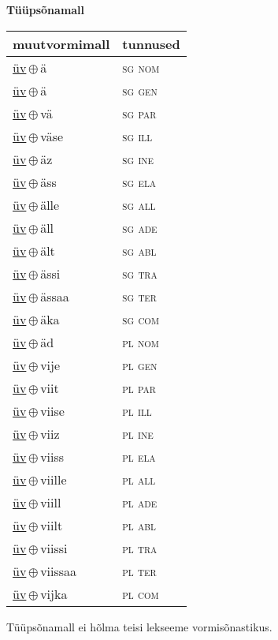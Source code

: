 

\vspace{3.5em}
\noindent \begin{minipage}{\textwidth}
\noindent \textbf{Tüüpsõnamall \,}\\

\begin{sideways}
\begin{tabular}{l l}
muutvormimall & tunnused \\
\hline
\underline{üv}\,$\oplus$\,ä & \textsc{ sg nom } \\
\underline{üv}\,$\oplus$\,ä & \textsc{ sg gen } \\
\underline{üv}\,$\oplus$\,vä & \textsc{ sg par } \\
\underline{üv}\,$\oplus$\,väse & \textsc{ sg ill } \\
\underline{üv}\,$\oplus$\,äz & \textsc{ sg ine } \\
\underline{üv}\,$\oplus$\,äss & \textsc{ sg ela } \\
\underline{üv}\,$\oplus$\,älle & \textsc{ sg all } \\
\underline{üv}\,$\oplus$\,äll & \textsc{ sg ade } \\
\underline{üv}\,$\oplus$\,ält & \textsc{ sg abl } \\
\underline{üv}\,$\oplus$\,ässi & \textsc{ sg tra } \\
\underline{üv}\,$\oplus$\,ässaa & \textsc{ sg ter } \\
\underline{üv}\,$\oplus$\,äka & \textsc{ sg com } \\
\underline{üv}\,$\oplus$\,äd & \textsc{ pl nom } \\
\underline{üv}\,$\oplus$\,vije & \textsc{ pl gen } \\
\underline{üv}\,$\oplus$\,viit & \textsc{ pl par } \\
\underline{üv}\,$\oplus$\,viise & \textsc{ pl ill } \\
\underline{üv}\,$\oplus$\,viiz & \textsc{ pl ine } \\
\underline{üv}\,$\oplus$\,viiss & \textsc{ pl ela } \\
\underline{üv}\,$\oplus$\,viille & \textsc{ pl all } \\
\underline{üv}\,$\oplus$\,viill & \textsc{ pl ade } \\
\underline{üv}\,$\oplus$\,viilt & \textsc{ pl abl } \\
\underline{üv}\,$\oplus$\,viissi & \textsc{ pl tra } \\
\underline{üv}\,$\oplus$\,viissaa & \textsc{ pl ter } \\
\underline{üv}\,$\oplus$\,vijka & \textsc{ pl com } \\
\end{tabular}
\end{sideways}
\label{tab:tüüpsõnamall-üvä}

\end{minipage}

 
\vspace{1em}
\noindent Tüüpsõnamall  ei hõlma teisi lekseeme vormi\-sõnastikus.
